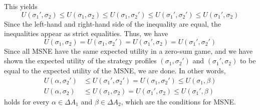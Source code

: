 \documentclass[9pt]{article}
\begin{document}
This yields
\begin{equation}
    U(\sigma_{1}', \sigma_{2}) \leq U(\sigma_{1}, \sigma_{2}) \leq U(\sigma_{1}, \sigma_{2}')
    \leq U(\sigma_{1}', \sigma_{2}') \leq U(\sigma_{1}', \sigma_{2})
\end{equation}
Since the left-hand and right-hand side of the inequality are equal, the inequalities appear as strict equalities.
Thus, we have
\begin{equation}
    U(\sigma_{1}, \sigma_{2}) = U(\sigma_{1}, \sigma_{2}') = U(\sigma_{1}', \sigma_{2}) = U(\sigma_{1}', \sigma_{2}')
\end{equation}
Since all MSNE have the same expected utility in a zero-sum game, and we have shown the expected utility of the strategy profiles $(\sigma_{1}, \sigma_{2}')$ and $(\sigma_{1}', \sigma_{2})$ to be equal to the expected utility of the MSNE, we are done.
In other words,
\begin{align}
    U(\alpha, \sigma_{2}') &\leq U(\sigma_{1}', \sigma_{2}') = U(\sigma_{1}, \sigma_{2}') \leq U(\sigma_{1}, \beta) \\
    U(\alpha, \sigma_{2}) &\leq U(\sigma_{1}, \sigma_{2}) = U(\sigma_{1}', \sigma_{2}) \leq U(\sigma_{1}', \beta)
\end{align}
holds for every $\alpha \in \Delta A_{1}$ and $\beta \in \Delta A_{2}$, which are the conditions for MSNE.
\end{document}
